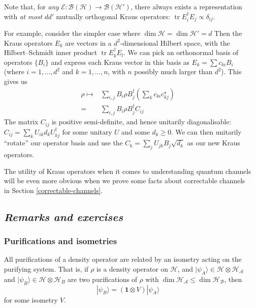 \documentclass[fleqn,a4paper]{article}
\theoremstyle{definition}
\theoremstyle{definition}
\theoremstyle{definition}
\theoremstyle{definition}
\theoremstyle{remark}
\begin{document}
Note that, for \emph{any} \(\mathcal{E}\colon\mathcal{B}(\mathcal{H})\to\mathcal{B}(\mathcal{H}')\), there always exists a representation with \emph{at most} \(dd'\) mutually orthogonal Kraus operators: \(\operatorname{tr}E^\dagger_iE_j\propto\delta_{ij}\).

For example, consider the simpler case where \(\dim\mathcal{H}=\dim\mathcal{H}'=d\)
Then the Kraus operators \(E_k\) are vectors in a \(d^2\)-dimensional Hilbert space, with the Hilbert--Schmidt inner product \(\operatorname{tr}E^\dagger_k E_l\).
We can pick an orthonormal basis of operators \(\{B_i\}\) and express each Kraus vector in this basis as \(E_k=\sum c_{ki} B_i\) (where \(i=1,\ldots,d^2\) and \(k=1,\ldots,n\), with \(n\) possibly much larger than \(d^2\)).
This gives us
\[
  \begin{aligned}
    \rho
    \longmapsto
    & \sum_{i,j} B_i\rho B^\dagger_j \left(\sum _k c_{ki}c^\star_{kj}\right)
  \\=& \sum_{i,j} B_i\rho B^\dagger_j  C_{ij}
  \end{aligned}
\]
The matrix \(C_{ij}\) is positive semi-definite, and hence unitarily diagonalisable: \(C_{ij}=\sum_k U_{ik} d_k U^\dagger_{kj}\) for some unitary \(U\) and some \(d_k\geqslant 0\).
We can then unitarily ``rotate'' our operator basis and use the \(C_k=\sum_j U_{jk}B_j \sqrt{d_k}\) as our new Kraus operators.

The utility of Kraus operators when it comes to understanding quantum channels will be even more obvious when we prove some facts about correctable channels in Section \ref{correctable-channels}.

\hypertarget{remarks-and-exercises-quantum-channels}{%
\subsection{\texorpdfstring{\emph{Remarks and exercises}}{Remarks and exercises}}\label{remarks-and-exercises-quantum-channels}}

\hypertarget{purifications-and-isometries}{%
\subsubsection{Purifications and isometries}\label{purifications-and-isometries}}

All purifications of a density operator are related by an isometry acting on the purifying system.
That is, if \(\rho\) is a density operator on \(\mathcal{H}\), and \(|\psi_A\rangle\in \mathcal{H}\otimes\mathcal{H}_\mathcal{A}\) and \(|\psi_B\rangle\in\mathcal{H}\otimes\mathcal{H}_B\) are two purifications of \(\rho\) with \(\dim\mathcal{H}_\mathcal{A}\leqslant\dim\mathcal{H}_\mathcal{B}\), then
\[
  |\psi_B\rangle=(\mathbf{1}\otimes V)|\psi_A\rangle
\]
for some isometry \(V\).
\end{document}
